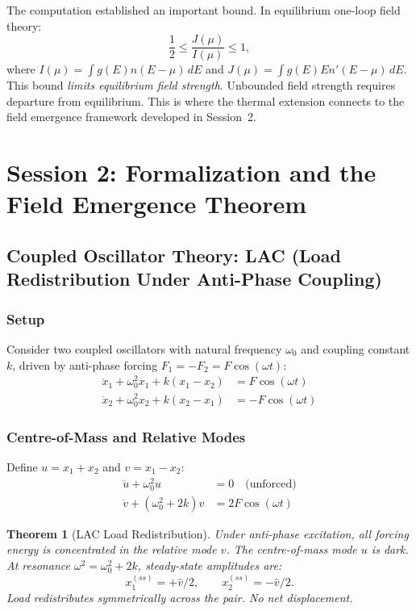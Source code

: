 \documentclass[11pt,twoside]{article}
\newtheorem{theorem}{Theorem}[section]
\begin{document}
The computation established an important bound. In equilibrium one-loop field theory:
\[
  \frac{1}{2} \leq \frac{J(\mu)}{I(\mu)} \leq 1,
\]
where $I(\mu) = \int g(E) n(E-\mu)\,dE$ and $J(\mu) = \int g(E) E n'(E-\mu)\,dE$.
This bound \emph{limits equilibrium field strength}. Unbounded field strength requires
departure from equilibrium. This is where the thermal extension connects to the field
emergence framework developed in Session~2.

\section{Session 2: Formalization and the Field Emergence Theorem}

\subsection{Coupled Oscillator Theory: LAC (Load Redistribution Under Anti-Phase Coupling)}

\subsubsection{Setup}

Consider two coupled oscillators with natural frequency $\omega_0$ and coupling
constant $k$, driven by anti-phase forcing $F_1 = -F_2 = F\cos(\omega t)$:
\begin{align*}
  \ddot{x}_1 + \omega_0^2 x_1 + k(x_1 - x_2) &= F\cos(\omega t)\\
  \ddot{x}_2 + \omega_0^2 x_2 + k(x_2 - x_1) &= -F\cos(\omega t)
\end{align*}

\subsubsection{Centre-of-Mass and Relative Modes}

Define $u = x_1 + x_2$ and $v = x_1 - x_2$:
\begin{align*}
  \ddot{u} + \omega_0^2 u &= 0 \quad \text{(unforced)}\\
  \ddot{v} + (\omega_0^2 + 2k) v &= 2F\cos(\omega t)
\end{align*}

\begin{theorem}[LAC Load Redistribution]
Under anti-phase excitation, all forcing energy is concentrated in the relative mode $v$.
The centre-of-mass mode $u$ is dark. At resonance $\omega^2 = \omega_0^2 + 2k$,
steady-state amplitudes are:
\[
  x_1^{(ss)} = +\hat{v}/2, \qquad x_2^{(ss)} = -\hat{v}/2.
\]
Load redistributes symmetrically across the pair. No net displacement.
\end{theorem}
\end{document}
